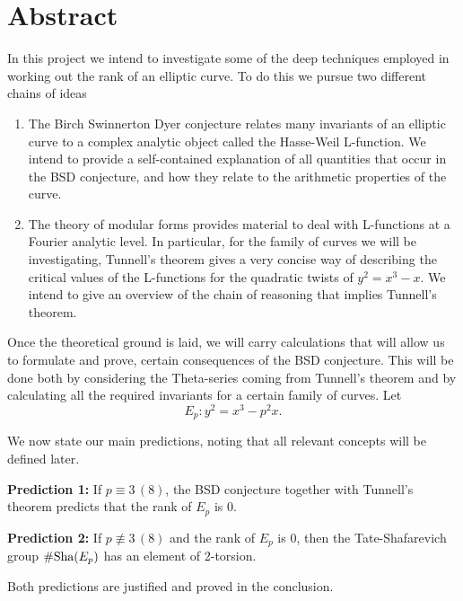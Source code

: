 \documentclass[12pt, a4paper]{amsart}
\begin{document}
\tableofcontents
\pagebreak

\maketitle

\section{Abstract}

In this project we intend to investigate some of the deep techniques employed in
working out the rank of an elliptic curve. To do this we pursue two different
chains of ideas
\begin{enumerate}
\item The Birch Swinnerton Dyer conjecture relates many invariants of an
  elliptic curve to a complex analytic object called the Hasse-Weil L-function.
  We intend to provide a self-contained explanation of all quantities that occur
  in the BSD conjecture, and how they relate to the arithmetic properties of the
  curve.
\item The theory of modular forms provides material to deal with L-functions at
  a Fourier analytic level. In particular, for the family of curves we will be
  investigating, Tunnell's theorem gives a very concise way of describing the
  critical values of the L-functions for the quadratic twists of $y^2 = x^3-x$.
  We intend to give an overview of the chain of reasoning that implies Tunnell's theorem.
\end{enumerate}

Once the theoretical ground is laid, we will carry calculations that will allow
us to formulate and prove, certain consequences of the BSD
conjecture. This will be done both by considering the Theta-series coming from
Tunnell's theorem and by calculating all the required invariants for a certain
family of curves. Let
\[E_p : y^2 = x^3 - p^2 x.\]

We now state our main predictions, noting that all relevant concepts
will be defined later. 

\textbf{Prediction 1:} If $p \equiv 3 \, (8)$, the BSD conjecture together with
Tunnell's theorem predicts that the rank of $E_p$ is 0.

\textbf{Prediction 2:} If $p \not\equiv 3 \, (8)$ and the rank of $E_p$ is 0,
then the Tate-Shafarevich group $\# \text{\normalfont Sha}(E_p)$ has an element of 2-torsion.

Both predictions are justified and proved in the conclusion. 
\end{document}
